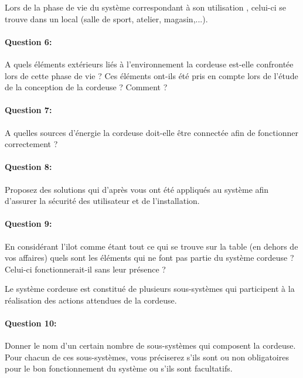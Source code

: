 
Lors de la phase de vie du système correspondant à son \og utilisation \fg, celui-ci se trouve dans un local (salle de sport, atelier, magasin,...).

\paragraph{Question 6:} A quels éléments extérieurs liés à l'environnement la cordeuse est-elle confrontée lors de cette phase de vie ? Ces éléments ont-ils été pris en compte lors de l'étude de la conception de la cordeuse ? Comment ?

\paragraph{Question 7:} A quelles sources d'énergie la cordeuse doit-elle être connectée afin de fonctionner correctement ?

\paragraph{Question 8:} Proposez des solutions qui d'après vous ont été appliqués au système afin d'assurer la sécurité des utilisateur et de l'installation.

\paragraph{Question 9:} En considérant l'ilot comme étant tout ce qui se trouve sur la table (en dehors de vos affaires) quels sont les éléments qui ne font pas partie du système cordeuse ? Celui-ci fonctionnerait-il sans leur présence ?


Le système cordeuse est constitué de plusieurs sous-systèmes qui participent à la réalisation des actions attendues de la cordeuse.

\paragraph{Question 10:} Donner le nom d'un certain nombre de sous-systèmes qui composent la cordeuse. Pour chacun de ces sous-systèmes, vous préciserez s'ils sont ou non obligatoires pour le bon fonctionnement du système ou s'ils sont facultatifs.

